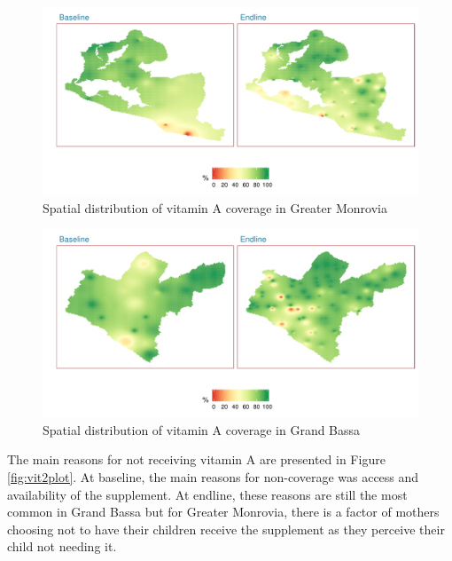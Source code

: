 \documentclass[12pt,a4paper]{article}
\begin{document}
\begin{figure}[H]

{\centering \includegraphics{liberiaCoverageFinalReport_files/figure-latex/vit1map-1} 

}

\caption{Spatial distribution of vitamin A coverage in Greater Monrovia}\label{fig:vit1map}
\end{figure}

\begin{figure}[H]

{\centering \includegraphics{liberiaCoverageFinalReport_files/figure-latex/vit2map-1} 

}

\caption{Spatial distribution of vitamin A coverage in Grand Bassa}\label{fig:vit2map}
\end{figure}

The main reasons for not receiving vitamin A are presented in Figure \ref{fig:vit2plot}. At baseline, the main reasons for non-coverage was access and availability of the supplement. At endline, these reasons are still the most common in Grand Bassa but for Greater Monrovia, there is a factor of mothers choosing not to have their children receive the supplement as they perceive their child not needing it.
\end{document}
